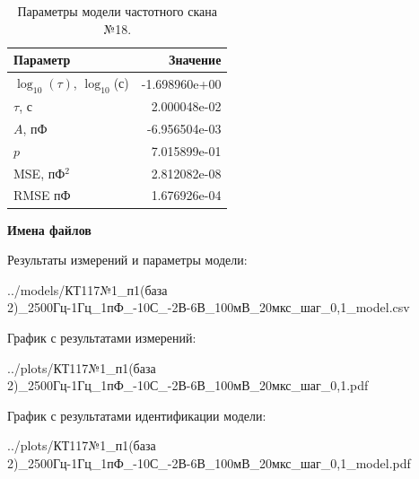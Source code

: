 \begin{table}[!ht]
    \centering
    \caption{Параметры модели частотного скана №18.}
    \begin{tabular}{|l|r|}
        \hline
        Параметр                                       & Значение                  \\ \hline
        $\log_{10}(\tau)$, $\log_{10}$(с)              & -1.698960e+00             \\ \hline
        $\tau$, с                                      & 2.000048e-02              \\ \hline
        $A$, пФ                                        & -6.956504e-03             \\ \hline
        $p$                                            & 7.015899e-01              \\ \hline
        MSE, пФ$^2$                                    & 2.812082e-08              \\ \hline
        RMSE пФ                                        & 1.676926e-04              \\ \hline
    \end{tabular}
    \label{table:frequency_scan_model_18}
\end{table}

\textbf{Имена файлов}

Результаты измерений и параметры модели:

\scriptsize../models/КТ117№1\_п1(база 2)\_2500Гц-1Гц\_1пФ\_-10С\_-2В-6В\_100мВ\_20мкс\_шаг\_0,1\_model.csv
\normalsize

График с результатами измерений:

\scriptsize../plots/КТ117№1\_п1(база 2)\_2500Гц-1Гц\_1пФ\_-10С\_-2В-6В\_100мВ\_20мкс\_шаг\_0,1.pdf
\normalsize

График с результатами идентификации модели:

\scriptsize../plots/КТ117№1\_п1(база 2)\_2500Гц-1Гц\_1пФ\_-10С\_-2В-6В\_100мВ\_20мкс\_шаг\_0,1\_model.pdf
\normalsize

